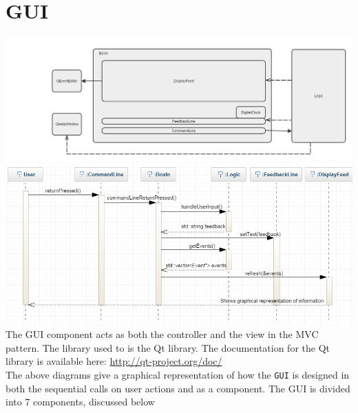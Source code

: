 \documentclass[12pt]{extarticle}
\begin{document}
\pagebreak
\section{GUI}

\includegraphics[width=\textwidth]{component_design_gui}
\includegraphics[width=\textwidth]{gui_sequence_diagram}
The GUI component acts as both the controller and the view in the MVC pattern. The library used to is the Qt library. The documentation for the Qt library is available here: \href{http://qt-project.org/doc/}{http://qt-project.org/doc/}\\
The above diagrams give a graphical representation of how the \texttt{GUI} is designed in both the sequential calls on user actions and as a component.
The GUI is divided into 7 components, discussed below
\end{document}
